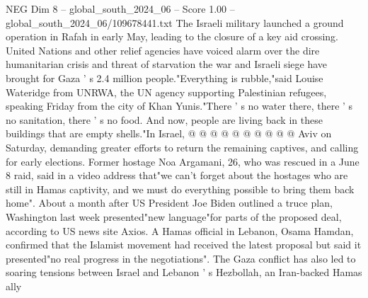 \begin{textsample}{NEG Dim 8 – global\_south\_2024\_06 – Score 1.00 – global\_south\_2024\_06/109678441.txt}
The Israeli military launched a ground operation in Rafah in early May, leading to the closure of a key aid crossing.
United Nations and other relief agencies have voiced alarm over the dire humanitarian crisis and threat of starvation the war and Israeli siege have brought for Gaza ' s 2.4 million people."Everything is rubble,"said Louise Wateridge from UNRWA, the UN agency supporting Palestinian refugees, speaking Friday from the city of Khan Yunis."There ' s no water there, there ' s no sanitation, there ' s no food.
And now, people are living back in these buildings that are empty shells."In Israel, @ @ @ @ @ @ @ @ @ @ Aviv on Saturday, demanding greater efforts to return the remaining captives, and calling for early elections.
Former hostage Noa Argamani, 26, who was rescued in a June 8 raid, said in a video address that"we can't forget about the hostages who are still in Hamas captivity, and we must do everything possible to bring them back home".
About a month after US President Joe Biden outlined a truce plan, Washington last week presented"new language"for parts of the proposed deal, according to US news site Axios.
A Hamas official in Lebanon, Osama Hamdan, confirmed that the Islamist movement had received the latest proposal but said it presented"no real progress in the negotiations".
The Gaza conflict has also led to soaring tensions between Israel and Lebanon ' s Hezbollah, an Iran-backed Hamas ally

\end{textsample}
